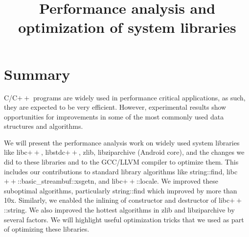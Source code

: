 \documentclass[10pt]{article}
\begin{document}
\title{Performance analysis and optimization of system libraries}


\date{}
\maketitle

\section*{Summary}
C/C$++$ programs are widely used in performance critical applications, as such,
they are expected to be very efficient. However, experimental results show
opportunities for improvements in some of the most commonly used data structures
and algorithms.

We will present the performance analysis work on widely used system libraries
like libc$++$, libstdc$++$, zlib, libziparchive (Android core), and the changes
we did to these libraries and to the GCC/LLVM compiler to optimize them. This
includes our contributions to standard library algorithms like string::find,
libc$++$::basic\_streambuf::xsgetn, and libc$++$::locale. We improved these
suboptimal algorithms, particularly string::find which improved by more than
10x. Similarly, we enabled the inlining of constructor and destructor of
libc$++$::string. We also improved the hottest algorithms in zlib and
libziparchive by several factors. We will highlight useful optimization tricks
that we used as part of optimizing these libraries.
\end{document}
